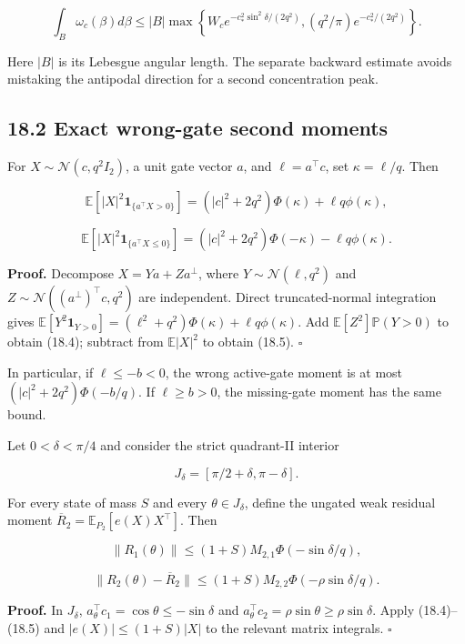 \documentclass[
  10pt,
]{article}
\begin{document}
\[
 \int_B\omega_c(\beta)d\beta
 \le |B|\max\left\{W_c e^{-c_*^2\sin^2\delta/(2q^2)},
                    (q^2/\pi)e^{-c_*^2/(2q^2)}\right\}.
 \tag{18.3}
\]

Here \(|B|\) is its Lebesgue angular length. The separate backward
estimate avoids mistaking the antipodal direction for a second
concentration peak.

\subsection{18.2 Exact wrong-gate second
moments}\label{exact-wrong-gate-second-moments}

For \(X\sim\mathcal N(c,q^2I_2)\), a unit gate vector \(a\), and
\(\ell=a^\top c\), set \(\kappa=\ell/q\). Then

\[
 \mathbb E[|X|^2\mathbf1_{\{a^\top X>0\}}]
 =(|c|^2+2q^2)\Phi(\kappa)+\ell q\phi(\kappa),
 \tag{18.4}
\]

\[
 \mathbb E[|X|^2\mathbf1_{\{a^\top X\le0\}}]
 =(|c|^2+2q^2)\Phi(-\kappa)-\ell q\phi(\kappa).
 \tag{18.5}
\]

\textbf{Proof.} Decompose \(X=Ya+Za^\perp\), where
\(Y\sim\mathcal N(\ell,q^2)\) and
\(Z\sim\mathcal N((a^\perp)^\top c,q^2)\) are independent. Direct
truncated-normal integration gives
\(\mathbb E[Y^2\mathbf1_{Y>0}]=(\ell^2+q^2)\Phi(\kappa)+\ell q\phi(\kappa)\).
Add \(\mathbb E[Z^2]\mathbb P(Y>0)\) to obtain (18.4); subtract from
\(\mathbb E|X|^2\) to obtain (18.5). \(\square\)

In particular, if \(\ell\le-b<0\), the wrong active-gate moment is at
most \((|c|^2+2q^2)\Phi(-b/q)\). If \(\ell\ge b>0\), the missing-gate
moment has the same bound.

Let \(0<\delta<\pi/4\) and consider the strict quadrant-II interior

\[
 J_\delta=[\pi/2+\delta,\pi-\delta].
\]

For every state of mass \(S\) and every \(\theta\in J_\delta\), define
the ungated weak residual moment
\(\overline R_2=\mathbb E_{P_2}[e(X)X^\top]\). Then

\[
 \boxed{\|R_1(\theta)\|\le
 (1+S)M_{2,1}\Phi(-\sin\delta/q),}
\]

\[
 \boxed{\|R_2(\theta)-\overline R_2\|\le
 (1+S)M_{2,2}\Phi(-\rho\sin\delta/q).}
 \tag{18.6}
\]

\textbf{Proof.} In \(J_\delta\),
\(a_\theta^\top c_1=\cos\theta\le-\sin\delta\) and
\(a_\theta^\top c_2=\rho\sin\theta\ge\rho\sin\delta\). Apply
(18.4)--(18.5) and \(|e(X)|\le(1+S)|X|\) to the relevant matrix
integrals. \(\square\)
\end{document}
